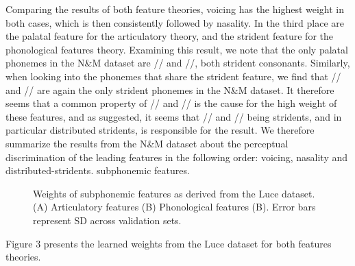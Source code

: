 Comparing the results of both feature theories, voicing has the highest weight in both cases, which is then consistently followed by nasality. In the third place are the palatal feature for the articulatory theory, and the strident feature for the phonological features theory. Examining this result, we note that the only palatal phonemes in the N\&M dataset are // and //, both strident consonants. Similarly, when looking into the phonemes that share the strident feature, we find that // and // are again the only strident phonemes in the N\&M dataset. It therefore seems that a common property of // and // is the cause for the high weight of these features, and as suggested, it seems that // and // being stridents, and in particular distributed stridents, is responsible for the result. We therefore summarize the results from the N\&M dataset about the perceptual discrimination of the leading features in the following order: voicing, nasality and distributed-stridents. subphonemic features.

\begin{figure}[H]
\caption{Weights of subphonemic features as derived from the Luce dataset. (A) Articulatory features (B) Phonological features (B). Error bars represent SD across validation sets.}
\end{figure}

Figure 3 presents the learned weights from the Luce dataset for both features theories.

